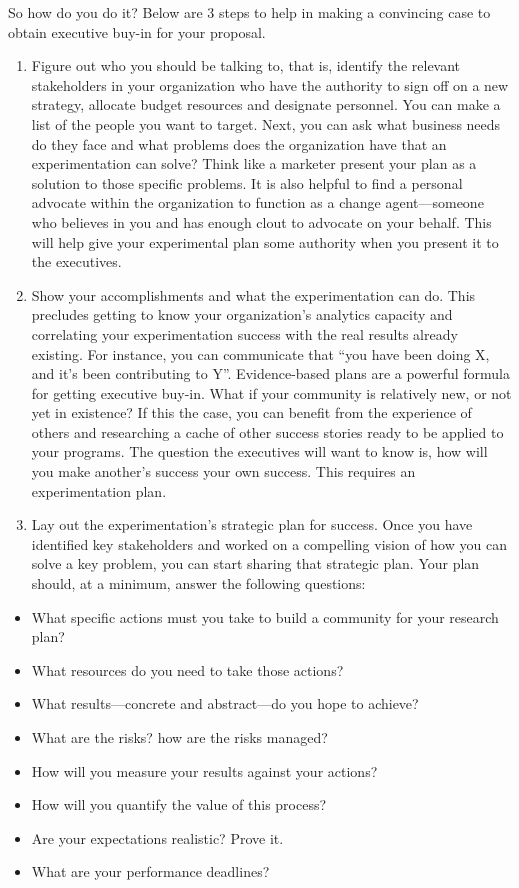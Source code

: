 \documentclass[]{book}
\providecommand{\tightlist}{%
  \setlength{\itemsep}{0pt}\setlength{\parskip}{0pt}}
\begin{document}
So how do you do it? Below are 3 steps to help in making a convincing case to obtain executive buy-in for your proposal.

\begin{enumerate}
\def\labelenumi{\arabic{enumi}.}
\item
  Figure out who you should be talking to, that is, identify the relevant stakeholders in your organization who have the authority to sign off on a new strategy, allocate budget resources and designate personnel. You can make a list of the people you want to target. Next, you can ask what business needs do they face and what problems does the organization have that an experimentation can solve? Think like a marketer present your plan as a solution to those specific problems. It is also helpful to find a personal advocate within the organization to function as a change agent---someone who believes in you and has enough clout to advocate on your behalf. This will help give your experimental plan some authority when you present it to the executives.
\item
  Show your accomplishments and what the experimentation can do. This precludes getting to know your organization's analytics capacity and correlating your experimentation success with the real results already existing. For instance, you can communicate that ``you have been doing X, and it's been contributing to Y''. Evidence-based plans are a powerful formula for getting executive buy-in. What if your community is relatively new, or not yet in existence? If this the case, you can benefit from the experience of others and researching a cache of other success stories ready to be applied to your programs. The question the executives will want to know is, how will you make another's success your own success. This requires an experimentation plan.
\item
  Lay out the experimentation's strategic plan for success. Once you have identified key stakeholders and worked on a compelling vision of how you can solve a key problem, you can start sharing that strategic plan. Your plan should, at a minimum, answer the following questions:
\end{enumerate}

\begin{itemize}
\tightlist
\item
  What specific actions must you take to build a community for your research plan?
\item
  What resources do you need to take those actions?
\item
  What results---concrete and abstract---do you hope to achieve?
\item
  What are the risks? how are the risks managed?
\item
  How will you measure your results against your actions?
\item
  How will you quantify the value of this process?
\item
  Are your expectations realistic? Prove it.
\item
  What are your performance deadlines?
\end{itemize}
\end{document}
